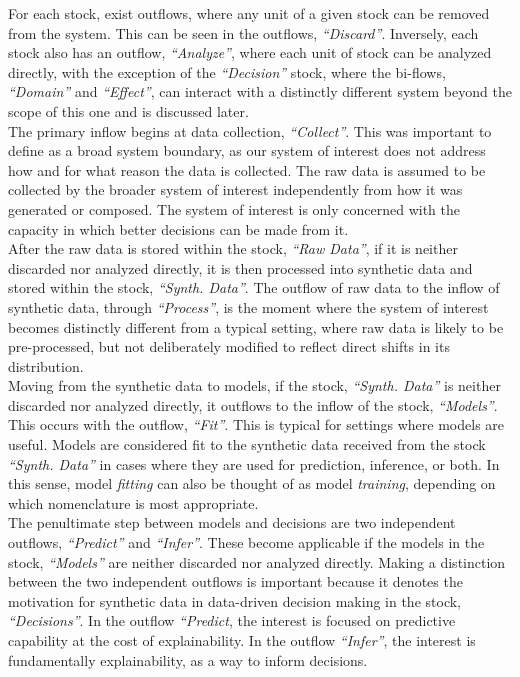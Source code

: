 \documentclass{article}
\begin{document}
For each stock, exist outflows, where any unit of a given stock can be removed from the system. This can be seen in the outflows, \textit{``Discard''}. Inversely, each stock also has an outflow, \textit{``Analyze''}, where each unit of stock can be analyzed directly, with the exception of the \textit{``Decision''} stock, where the bi-flows, \textit{``Domain''} and \textit{``Effect''}, can interact with a distinctly different system beyond the scope of this one and is discussed later. \\

The primary inflow begins at data collection, \textit{``Collect''}. This was important to define as a broad system boundary, as our system of interest does not address how and for what reason the data is collected. The raw data is assumed to be collected by the broader system of interest independently from how it was generated or composed. The system of interest is only concerned with the capacity in which better decisions can be made from it. \\

After the raw data is stored within the stock, \textit{``Raw Data''}, if it is neither discarded nor analyzed directly, it is then processed into synthetic data and stored within the stock, \textit{``Synth. Data''}. The outflow of raw data to the inflow of synthetic data, through \textit{``Process''}, is the moment where the system of interest becomes distinctly different from a typical setting, where raw data is likely to be pre-processed, but not deliberately modified to reflect direct shifts in its distribution. \\

Moving from the synthetic data to models, if the stock, \textit{``Synth. Data''} is neither discarded nor analyzed directly, it outflows to the inflow of the stock, \textit{``Models''}. This occurs with the outflow, \textit{``Fit''}. This is typical for settings where models are useful. Models are considered fit to the synthetic data received from the stock \textit{``Synth. Data''} in cases where they are used for prediction, inference, or both. In this sense, model \textit{fitting} can also be thought of as model \textit{training}, depending on which nomenclature is most appropriate. \\

The penultimate step between models and decisions are two independent outflows, \textit{``Predict''} and \textit{``Infer''}. These become applicable if the models in the stock, \textit{``Models''} are neither discarded nor analyzed directly. Making a distinction between the two independent outflows is important because it denotes the motivation for synthetic data in data-driven decision making in the stock, \textit{``Decisions''}. In the outflow \textit{``Predict}, the interest is focused on predictive capability at the cost of explainability. In the outflow \textit{``Infer''}, the interest is fundamentally explainability, as a way to inform decisions. \\
\end{document}
